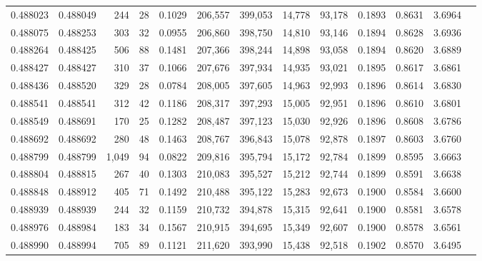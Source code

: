 \begin{tabular}{rrrrrrrrrrrrr}
0.488023 & 0.488049 &   244 &    28 &                                     0.1029 & 206,557 & 399,053 &  14,778 &  93,178 & 0.1893 & 0.8631 & 3.6964 \\
0.488075 & 0.488253 &   303 &    32 &                                     0.0955 & 206,860 & 398,750 &  14,810 &  93,146 & 0.1894 & 0.8628 & 3.6936 \\
0.488264 & 0.488425 &   506 &    88 &                                     0.1481 & 207,366 & 398,244 &  14,898 &  93,058 & 0.1894 & 0.8620 & 3.6889 \\
0.488427 & 0.488427 &   310 &    37 &                                     0.1066 & 207,676 & 397,934 &  14,935 &  93,021 & 0.1895 & 0.8617 & 3.6861 \\
0.488436 & 0.488520 &   329 &    28 &                                     0.0784 & 208,005 & 397,605 &  14,963 &  92,993 & 0.1896 & 0.8614 & 3.6830 \\
0.488541 & 0.488541 &   312 &    42 &                                     0.1186 & 208,317 & 397,293 &  15,005 &  92,951 & 0.1896 & 0.8610 & 3.6801 \\
0.488549 & 0.488691 &   170 &    25 &                                     0.1282 & 208,487 & 397,123 &  15,030 &  92,926 & 0.1896 & 0.8608 & 3.6786 \\
0.488692 & 0.488692 &   280 &    48 &                                     0.1463 & 208,767 & 396,843 &  15,078 &  92,878 & 0.1897 & 0.8603 & 3.6760 \\
0.488799 & 0.488799 & 1,049 &    94 &                                     0.0822 & 209,816 & 395,794 &  15,172 &  92,784 & 0.1899 & 0.8595 & 3.6663 \\
0.488804 & 0.488815 &   267 &    40 &                                     0.1303 & 210,083 & 395,527 &  15,212 &  92,744 & 0.1899 & 0.8591 & 3.6638 \\
0.488848 & 0.488912 &   405 &    71 &                                     0.1492 & 210,488 & 395,122 &  15,283 &  92,673 & 0.1900 & 0.8584 & 3.6600 \\
0.488939 & 0.488939 &   244 &    32 &                                     0.1159 & 210,732 & 394,878 &  15,315 &  92,641 & 0.1900 & 0.8581 & 3.6578 \\
0.488976 & 0.488984 &   183 &    34 &                                     0.1567 & 210,915 & 394,695 &  15,349 &  92,607 & 0.1900 & 0.8578 & 3.6561 \\
0.488990 & 0.488994 &   705 &    89 &                                     0.1121 & 211,620 & 393,990 &  15,438 &  92,518 & 0.1902 & 0.8570 & 3.6495 \\

\end{tabular}
